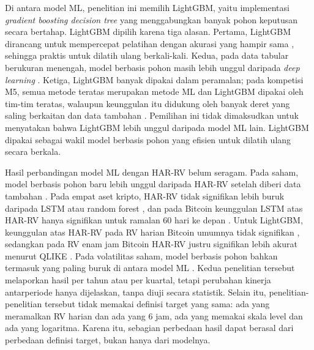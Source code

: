 Di antara model ML, penelitian ini memilih LightGBM, yaitu implementasi
\textit{gradient boosting decision tree} yang menggabungkan banyak pohon
keputusan secara bertahap. LightGBM dipilih karena tiga alasan. Pertama,
LightGBM dirancang untuk mempercepat pelatihan dengan akurasi yang hampir sama
\cite{ke2017}, sehingga praktis untuk dilatih ulang berkali-kali. Kedua, pada
data tabular berukuran menengah, model berbasis pohon masih lebih unggul
daripada \textit{deep learning} \cite{grinsztajn2022}. Ketiga, LightGBM banyak
dipakai dalam peramalan; pada kompetisi M5, semua metode teratas merupakan
metode ML dan LightGBM dipakai oleh tim-tim teratas, walaupun keunggulan itu
didukung oleh banyak deret yang saling berkaitan dan data tambahan
\cite{makridakis2022}. Pemilihan ini tidak dimaksudkan untuk menyatakan bahwa
LightGBM lebih unggul daripada model ML lain. LightGBM dipakai sebagai wakil
model berbasis pohon yang efisien untuk dilatih ulang secara berkala.

Hasil perbandingan model ML dengan HAR-RV belum seragam. Pada saham, model
berbasis pohon baru lebih unggul daripada HAR-RV setelah diberi data tambahan
\cite{christensen2023}. Pada empat aset kripto, HAR-RV tidak signifikan lebih
buruk daripada LSTM atau random forest \cite{dudek2024}, dan pada Bitcoin
keunggulan LSTM atas HAR-RV hanya signifikan untuk ramalan 60 hari ke depan
\cite{huang2024}. Untuk LightGBM, keunggulan atas HAR-RV pada RV harian
Bitcoin umumnya tidak signifikan \cite{dudek2025lgbm}, sedangkan pada RV enam
jam Bitcoin HAR-RV justru signifikan lebih akurat menurut QLIKE
\cite{brauneis2026}. Pada volatilitas saham, model berbasis pohon bahkan termasuk yang
paling buruk di antara model ML \cite{kilic2025,pyrlik2021}. Kedua penelitian
tersebut melaporkan hasil per tahun atau per kuartal, tetapi perubahan kinerja
antarperiode hanya dijelaskan, tanpa diuji secara statistik. Selain itu,
penelitian-penelitian tersebut tidak memakai definisi target yang sama: ada
yang meramalkan RV harian dan ada yang 6 jam, ada yang memakai skala level dan
ada yang logaritma. Karena itu, sebagian perbedaan hasil dapat berasal dari
perbedaan definisi target, bukan hanya dari modelnya.

